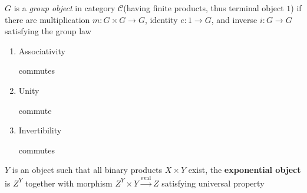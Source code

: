 \documentclass[main]{subfiles}
\begin{document}
\begin{definition}
$G$ is a \textit{group object} in category $\mathcal C$(having finite products, thus terminal object $1$) if there are multiplication $m:G\times G\to G$, identity $e:1\to G$, and inverse $i:G\to G$ satisfying the group law
\begin{enumerate}
\item Associativity  commutes
\item Unity 
\quad {} commute
\item Invertibility
 commutes
\end{enumerate}
\end{definition}

\begin{definition}
$Y$ is an object such that all binary products $X\times Y$ exist, the \textbf{exponential object} is $Z^Y$ together with morphism $Z^Y\times Y\xrightarrow{\mathrm{eval}} Z$ satisfying universal property
\begin{center}
\end{center}
\end{definition}
\end{document}
